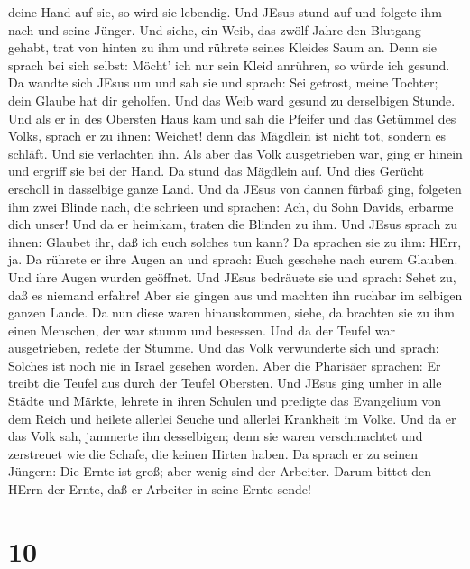 deine Hand auf sie, so wird sie lebendig.  Und JEsus stund
auf und folgete ihm nach und seine Jünger.  Und siehe, ein
Weib, das zwölf Jahre den Blutgang gehabt, trat von hinten zu ihm und
rührete seines Kleides Saum an.  Denn sie sprach bei sich
selbst: Möcht' ich nur sein Kleid anrühren, so würde ich gesund.
 Da wandte sich JEsus um und sah sie und sprach: Sei
getrost, meine Tochter; dein Glaube hat dir geholfen. Und das Weib ward
gesund zu derselbigen Stunde.  Und als er in des Obersten
Haus kam und sah die Pfeifer und das Getümmel des Volks, 
sprach er zu ihnen: Weichet! denn das Mägdlein ist nicht tot, sondern es
schläft. Und sie verlachten ihn.  Als aber das Volk
ausgetrieben war, ging er hinein und ergriff sie bei der Hand. Da stund
das Mägdlein auf.  Und dies Gerücht erscholl in dasselbige
ganze Land.  Und da JEsus von dannen fürbaß ging, folgeten
ihm zwei Blinde nach, die schrieen und sprachen: Ach, du Sohn Davids,
erbarme dich unser!  Und da er heimkam, traten die Blinden
zu ihm. Und JEsus sprach zu ihnen: Glaubet ihr, daß ich euch solches tun
kann? Da sprachen sie zu ihm: HErr, ja.  Da rührete er ihre
Augen an und sprach: Euch geschehe nach eurem Glauben.  Und
ihre Augen wurden geöffnet. Und JEsus bedräuete sie und sprach: Sehet
zu, daß es niemand erfahre!  Aber sie gingen aus und
machten ihn ruchbar im selbigen ganzen Lande.  Da nun diese
waren hinauskommen, siehe, da brachten sie zu ihm einen Menschen, der
war stumm und besessen.  Und da der Teufel war
ausgetrieben, redete der Stumme. Und das Volk verwunderte sich und
sprach: Solches ist noch nie in Israel gesehen worden. 
Aber die Pharisäer sprachen: Er treibt die Teufel aus durch der Teufel
Obersten.  Und JEsus ging umher in alle Städte und Märkte,
lehrete in ihren Schulen und predigte das Evangelium von dem Reich und
heilete allerlei Seuche und allerlei Krankheit im Volke. 
Und da er das Volk sah, jammerte ihn desselbigen; denn sie waren
verschmachtet und zerstreuet wie die Schafe, die keinen Hirten haben.
 Da sprach er zu seinen Jüngern: Die Ernte ist groß; aber
wenig sind der Arbeiter.  Darum bittet den HErrn der Ernte,
daß er Arbeiter in seine Ernte sende!

\hypertarget{section-9}{%
\section{10}\label{section-9}}

